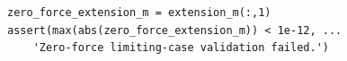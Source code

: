 \documentclass[border=12pt]{standalone}
\begin{document}
\begin{lstlisting}[style=matlab]
zero_force_extension_m = extension_m(:,1)
assert(max(abs(zero_force_extension_m)) < 1e-12, ...
    'Zero-force limiting-case validation failed.')
\end{lstlisting}
\end{document}
